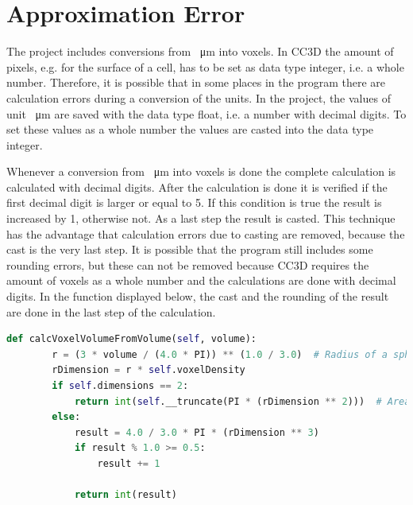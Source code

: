 \section{Approximation Error} \label{sec:ApproximationError}
The project includes conversions from \SI{}{\micro\metre} into voxels. In \ac{CC3D} the amount of pixels, e.g. for the surface of a cell, has to be set as data type integer, i.e. a whole number. Therefore, it is possible that in some places in the program there are calculation errors during a conversion of the units. In the project, the values of unit \SI{}{\micro\metre} are saved with the data type float, i.e. a number with decimal digits. To set these values as a whole number the values are casted into the data type integer. 

Whenever a conversion from \SI{}{\micro\metre} into voxels is done the complete calculation is calculated with decimal digits. After the calculation is done it is verified if the first decimal digit is larger or equal to 5. If this condition is true the result is increased by 1, otherwise not. As a last step the result is casted. This technique has the advantage that calculation errors due to casting are removed, because the cast is the very last step. It is possible that the program still includes some rounding errors, but these can not be removed because \ac{CC3D} requires the amount of voxels as a whole number and the calculations are done with decimal digits. \newline
In the function displayed below, the cast and the rounding of the result are done in the last step of the calculation.

\begin{lstlisting}[language=Python, caption = Function to calculate the volume of a sphere in voxels out of a given physical volume. First out of the given physical volume the radius is calculated. Then it is converted into the voxel unit. Next\, the volume of the voxel sphere is calculated and as last step\, the result is rounded and casted.]
   def calcVoxelVolumeFromVolume(self, volume):
        r = (3 * volume / (4.0 * PI)) ** (1.0 / 3.0)  # Radius of a sphere with known volume.
        rDimension = r * self.voxelDensity
        if self.dimensions == 2:
            return int(self.__truncate(PI * (rDimension ** 2)))  # Area of a circle.
        else:
            result = 4.0 / 3.0 * PI * (rDimension ** 3)
            if result % 1.0 >= 0.5:
                result += 1

            return int(result)
\end{lstlisting}

